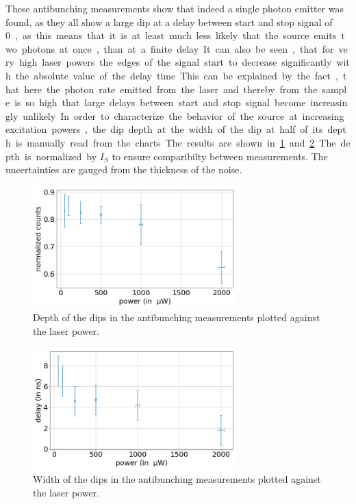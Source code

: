 These antibunching measurements show that indeed a single photon emitter was found, as they all show a large dip at a delay between start and stop signal of \SI{0}, as this means that it is at least much less likely that the source emits two photons at once, than at a finite delay.
It can also be seen, that for very high laser powers the edges of the signal start to decrease significantly with the absolute value of the delay time.
This can be explained by the fact, that here the photon rate emitted from the laser and thereby from the sample is so high that large delays between start and stop signal become increasingly unlikely.

In order to characterize the behavior of the source at increasing excitation powers, the dip depth at the width of the dip at half of its depth is manually read from the charts.
The results are shown in \cref{fig_dip_depth} and \cref{fig_dip_width}.
The depth is normalized by $I_S$ to ensure comparibilty between measurements.
The uncertainties are gauged from the thickness of the noise.

\begin{figure}[H]
    \centering
    \includegraphics[width=0.7\textwidth]{img/output_t2/dip_depth.png}
    \caption{Depth of the dips in the antibunching measurements plotted against the laser power.}
    \label{fig_dip_depth}
\end{figure}

\begin{figure}[H]
    \centering
    \includegraphics[width=0.7\textwidth]{img/output_t2/dip_width.png}
    \caption{Width of the dips in the antibunching measurements plotted against the laser power.}
    \label{fig_dip_width}
\end{figure}

